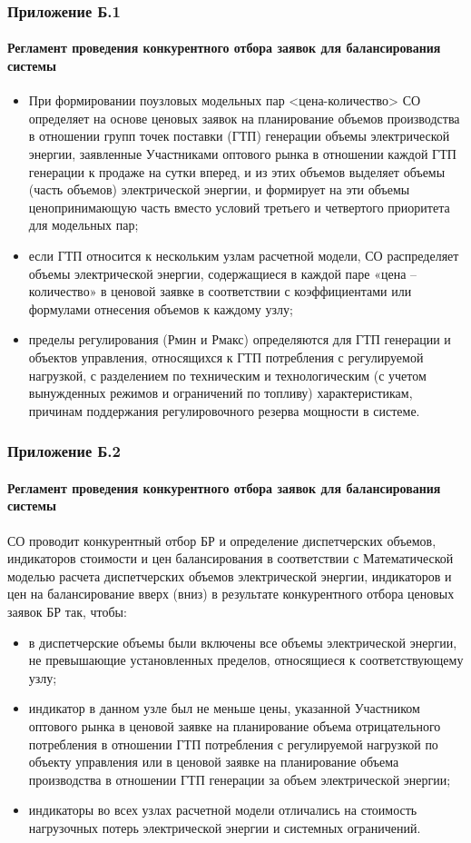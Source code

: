 \documentclass[c, dvipsnames]{beamer}  %
\begin{document}
\begin{frame}[shrink=5]
\frametitle{Приложение Б.1} 
\framesubtitle{Регламент проведения конкурентного  отбора заявок для балансирования системы} 

\footnotesize{
\begin{itemize}
	\item При формировании поузловых модельных пар <цена-количество> СО  определяет на основе ценовых заявок на планирование объемов производства в отношении групп точек поставки (ГТП) генерации объемы электрической энергии, заявленные Участниками оптового рынка в отношении каждой ГТП генерации к продаже на сутки вперед, и из этих объемов выделяет объемы (часть объемов) электрической энергии, и формирует на эти объемы ценопринимающую часть вместо условий третьего и четвертого приоритета для модельных пар;
	\item если ГТП относится к нескольким узлам расчетной модели, СО распределяет объемы электрической энергии, содержащиеся в каждой паре «цена – количество» в ценовой заявке в соответствии с коэффициентами или формулами отнесения объемов к каждому узлу;
	\item  пределы регулирования (Рмин и Рмакс) определяются для ГТП генерации и объектов управления, относящихся к ГТП потребления с регулируемой нагрузкой, с разделением по техническим и технологическим (с учетом вынужденных режимов и ограничений по топливу) характеристикам, причинам поддержания регулировочного резерва мощности в системе.
\end{itemize}
}

\end{frame}



\begin{frame}[shrink=5]
\frametitle{Приложение Б.2} 
\framesubtitle{Регламент проведения конкурентного  отбора заявок для балансирования системы} 

\footnotesize{
СО проводит конкурентный отбор БР и определение диспетчерских объемов, индикаторов стоимости и цен балансирования в соответствии с Математической моделью расчета диспетчерских объемов электрической энергии, индикаторов и цен на балансирование вверх (вниз) в результате конкурентного отбора ценовых заявок БР так, чтобы:
}
\begin{itemize}
\item в диспетчерские объемы были включены все объемы электрической энергии, не превышающие установленных пределов, относящиеся к соответствующему узлу;
\item индикатор в данном узле был не меньше цены, указанной Участником оптового рынка в ценовой заявке на планирование объема отрицательного потребления в отношении ГТП потребления с регулируемой нагрузкой по объекту управления или в ценовой заявке на планирование объема производства в отношении ГТП генерации за объем электрической энергии;
\item индикаторы во всех узлах расчетной модели отличались на стоимость нагрузочных потерь электрической энергии и системных ограничений.
\end{itemize}
\end{frame}
\end{document}
